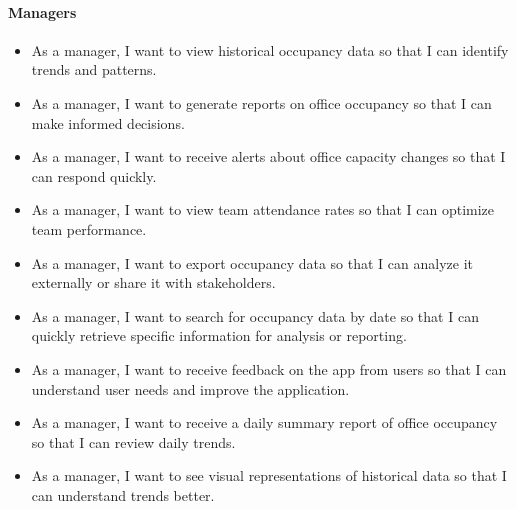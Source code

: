 \documentclass[11pt,a4paper]{article}
\begin{document}
\paragraph{Managers}
\begin{itemize}
    \item As a manager, I want to view historical occupancy data so that I can identify trends and patterns.
    \item As a manager, I want to generate reports on office occupancy so that I can make informed decisions.
    \item As a manager, I want to receive alerts about office capacity changes so that I can respond quickly.
    \item As a manager, I want to view team attendance rates so that I can optimize team performance.
    \item As a manager, I want to export occupancy data so that I can analyze it externally or share it with stakeholders.
    \item As a manager, I want to search for occupancy data by date so that I can quickly retrieve specific information for analysis or reporting.
    \item As a manager, I want to receive feedback on the app from users so that I can understand user needs and improve the application.
    \item As a manager, I want to receive a daily summary report of office occupancy so that I can review daily trends.
    \item As a manager, I want to see visual representations of historical data so that I can understand trends better.
\end{itemize}
\end{document}
